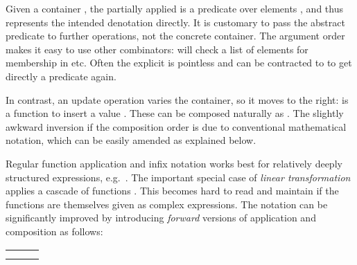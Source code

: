 \begin{isabellebody}
\begin{isamarkuptext}
  Given a container , the partially applied  is a predicate over elements , and
  thus represents the intended denotation directly.  It is customary
  to pass the abstract predicate to further operations, not the
  concrete container.  The argument order makes it easy to use other
  combinators:  will check a list of
  elements for membership in  etc. Often the explicit
   is pointless and can be contracted to  to get directly a predicate again.

  In contrast, an update operation varies the container, so it moves
  to the right:  is a function \isa{{\isasymbeta}\ {\isasymrightarrow}\ {\isasymbeta}} to
  insert a value .  These can be composed naturally as
  .  The slightly awkward
  inversion if the composition order is due to conventional
  mathematical notation, which can be easily amended as explained
  below.%
\end{isamarkuptext}%
\isamarkuptrue%
%
\isamarkuptrue%
%
\begin{isamarkuptext}%
Regular function application and infix notation works best for
  relatively deeply structured expressions, e.g.\ .  The important special case of \emph{linear transformation}
  applies a cascade of functions .  This
  becomes hard to read and maintain if the functions are themselves
  given as complex expressions.  The notation can be significantly
  improved by introducing \emph{forward} versions of application and
  composition as follows:

  \medskip
  \begin{tabular}{lll}
  \isa{x\ {\isacharbar}{\isachargreater}\ f} & \isa{{\isasymequiv}} & \isa{f\ x} \\
  \isa{f\ {\isacharhash}{\isachargreater}\ g} & \isa{{\isasymequiv}} & \isa{x\ {\isacharbar}{\isachargreater}\ f\ {\isacharbar}{\isachargreater}\ g} \\
  \end{tabular}
  \medskip


\end{isamarkuptext}
\end{isabellebody}
